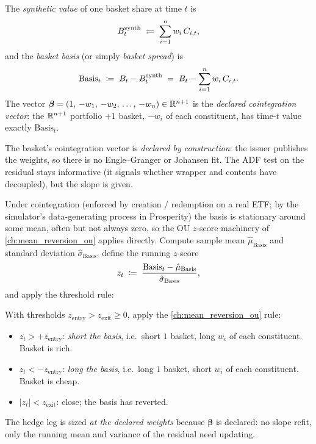 \begin{definition}
\label{def:basket_basis}
The \emph{synthetic value} of one basket share at time $t$ is
\begin{equation}
  B^{\text{synth}}_t \;\coloneqq\; \sum_{i=1}^n w_i\,C_{i,t},
  \label{eq:synthetic}
\end{equation}
and the \emph{basket basis} (or simply \emph{basket spread}) is
\begin{equation}
  \text{Basis}_t \;\coloneqq\; B_t - B^{\text{synth}}_t
  \;=\; B_t - \sum_{i=1}^n w_i\,C_{i,t}.
  \label{eq:basis}
\end{equation}
The vector
$\bm\beta = (1,\,-w_1,\,-w_2,\,\ldots,\,-w_n)\in\mathbb{R}^{n+1}$ is the
\emph{declared cointegration vector}: the $\mathbb{R}^{n+1}$ portfolio
$+1$ basket, $-w_i$ of each constituent, has time-$t$ value
exactly $\text{Basis}_t$.
\end{definition}

\begin{remark}
The basket's cointegration vector is \emph{declared by
construction}: the issuer publishes the weights, so there is no
Engle--Granger or Johansen fit. The ADF test on the residual stays
informative (it signals whether wrapper and contents have
decoupled), but the slope is given.
\end{remark}

Under cointegration (enforced by creation / redemption on a real
ETF; by the simulator's data-generating process in Prosperity) the
basis is stationary around some mean, often but not always zero, so
the OU $z$-score machinery of \cref{ch:mean_reversion_ou} applies
directly. Compute sample mean $\hat\mu_{\text{Basis}}$ and standard
deviation $\hat\sigma_{\text{Basis}}$, define the running $z$-score
\begin{equation}
  z_t \;\coloneqq\;
  \frac{\text{Basis}_t - \hat\mu_{\text{Basis}}}
       {\hat\sigma_{\text{Basis}}},
  \label{eq:basis_zscore}
\end{equation}
and apply the threshold rule:

\begin{keyfactbox}
With thresholds $z_{\text{entry}} > z_{\text{exit}} \geq 0$, apply
the \cref{ch:mean_reversion_ou} rule:
\begin{itemize}
  \item $z_t > +z_{\text{entry}}$: \emph{short the basis}, i.e.\ short
  $1$ basket, long $w_i$ of each constituent. Basket is rich.
  \item $z_t < -z_{\text{entry}}$: \emph{long the basis}, i.e.\ long
  $1$ basket, short $w_i$ of each constituent. Basket is cheap.
  \item $|z_t| < z_{\text{exit}}$: close; the basis has reverted.
\end{itemize}
The hedge leg is sized \emph{at the declared weights} because
$\bm\beta$ is declared: no slope refit, only the running mean and
variance of the residual need updating.
\end{keyfactbox}

